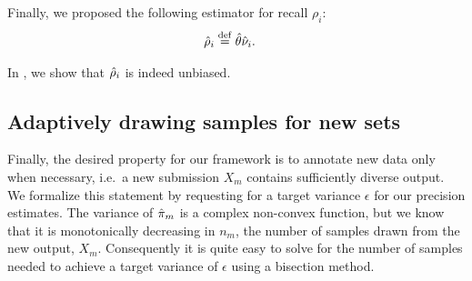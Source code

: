 Finally, we proposed the following estimator for recall $\rho_i$:
\begin{align*}
  {\hat{\rho}}_i &\stackrel{\rm def}{=} {\hat{\theta}}{\hat{\nu}}_i.
\end{align*}

In , we show that ${\hat{\rho}}_i$ is indeed unbiased.

\subsection{Adaptively drawing samples for new sets}
Finally, the desired property for our framework is to annotate new data only when necessary, i.e.\ a new submission $X_m$ contains sufficiently diverse output.
We formalize this statement by requesting for a target variance $\epsilon$ for our precision estimates.
The variance of ${\hat{\pi}}_m$ is a complex non-convex function, but we know that it is monotonically decreasing in $n_m$, the number of samples drawn from the new output, $X_m$.
Consequently it is quite easy to solve for the number of samples needed to achieve a target variance of $\epsilon$ using a bisection method.
